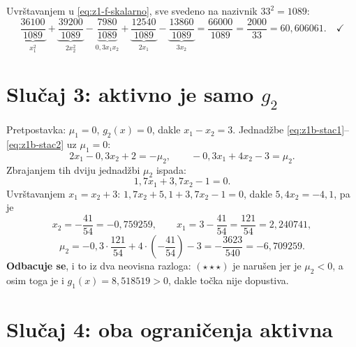 \begin{korak}
Uvrštavanjem u \eqref{eq:z1-f-skalarno}, sve svedeno na nazivnik $33^2 = 1089$:
\[
\underbrace{\frac{36100}{1089}}_{x_1^2}
+ \underbrace{\frac{39200}{1089}}_{2x_2^2}
- \underbrace{\frac{7980}{1089}}_{0{,}3x_1x_2}
+ \underbrace{\frac{12540}{1089}}_{2x_1}
- \underbrace{\frac{13860}{1089}}_{3x_2}
= \frac{66000}{1089} = \frac{2000}{33} = 60{,}606061 . \quad\checkmark
\]
\end{korak}

\section{Slučaj 3: aktivno je samo $g_2$}
\label{sec:z1b-slucaj3}

\begin{korak}
Pretpostavka: $\mu_1 = 0$, $g_2(x) = 0$, dakle $x_1 - x_2 = 3$.
Jednadžbe \eqref{eq:z1b-stac1}--\eqref{eq:z1b-stac2} uz $\mu_1 = 0$:
\[
2x_1 - 0{,}3x_2 + 2 = -\mu_2, \qquad -0{,}3x_1 + 4x_2 - 3 = \mu_2 .
\]
Zbrajanjem tih dviju jednadžbi $\mu_2$ ispada:
\[
1{,}7x_1 + 3{,}7x_2 - 1 = 0 .
\]
Uvrštavanjem $x_1 = x_2 + 3$: $1{,}7x_2 + 5{,}1 + 3{,}7x_2 - 1 = 0$, dakle
$5{,}4x_2 = -4{,}1$, pa je
\[
x_2 = -\frac{41}{54} = -0{,}759259, \qquad
x_1 = 3 - \frac{41}{54} = \frac{121}{54} = 2{,}240741 ,
\]
\[
\mu_2 = -0{,}3\cdot\frac{121}{54} + 4\cdot\left(-\frac{41}{54}\right) - 3
      = -\frac{3623}{540} = -6{,}709259 .
\]
\textbf{Odbacuje se}, i to iz dva neovisna razloga: $(\star\star\star)$ je
narušen jer je $\mu_2 < 0$, a osim toga je i $g_1(x) = 8{,}518519 > 0$, dakle
točka nije dopustiva.
\end{korak}

\section{Slučaj 4: oba ograničenja aktivna}
\label{sec:z1b-slucaj4}

